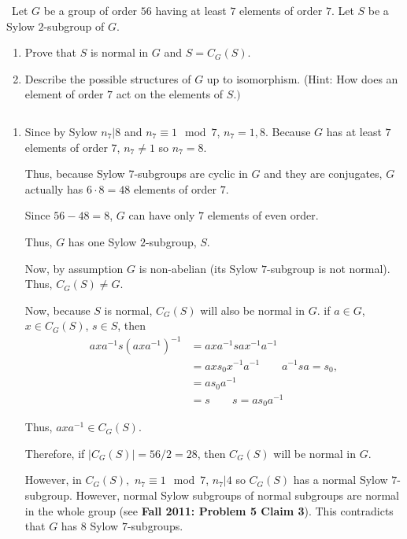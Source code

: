 \documentclass[12pt]{AlgebraQual}
\begin{document}
\begin{problem} $\,$
Let $G$ be a group of order $56$ having at least $7$ elements of order $7$. Let $S$ be a Sylow $2$-subgroup of $G.$
\begin{enumerate}[label=(\alph*)]
    \item Prove that $S$ is normal in $G$ and $S=C_G(S).$
    \item Describe the possible structures of $G$ up to isomorphism. (Hint: How does an element of order $7$ act on the elements of $S.)$
\end{enumerate}
\end{problem}


\begin{solution}$\,$
\begin{enumerate}[label=(\alph*)]
    \item Since by Sylow $n_7|8$ and $n_7\equiv 1\mod 7$, $n_7=1,8$. Because $G$ has at least $7$ elements of order $7$, $n_7\not=1$ so $n_7=8.$

    Thus, because Sylow $7$-subgroups are cyclic in $G$ and they are conjugates, $G$ actually has $6\cdot8=48$ elements of order $7.$

    Since $56-48=8$, $G$ can have only $7$ elements of even order.

    Thus, $G$ has one Sylow $2$-subgroup, $S.$

    Now, by assumption $G$ is non-abelian (its Sylow $7$-subgroup is not normal). Thus, $C_G(S)\not=G.$

    Now, because $S$ is normal, $C_G(S)$ will also be normal in $G.$ if $a\in G$, $x\in C_G(S)$, $s\in S$, then \begin{align*}
        axa^{-1}s(axa^{-1})^{-1}&=axa^{-1}sax^{-1}a^{-1}\\
        &=axs_0x^{-1}a^{-1}\qquad a^{-1}sa=s_0,\\
        &=as_0a^{-1}\\
        &=s\qquad s=as_0a^{-1}
    \end{align*}

    Thus, $axa^{-1}\in C_G(S).$

    Therefore, if $|C_G(S)|=56/2=28$, then $C_G(S)$ will be normal in $G$.

    However, in $C_G(S),$ $n_7\equiv 1\mod7$, $n_7|4$ so $C_G(S)$ has a normal Sylow $7$-subgroup. However, normal Sylow subgroups of normal subgroups are normal in the whole group (see \textbf{Fall 2011: Problem 5 Claim 3}). This contradicts that $G$ has $8$ Sylow $7$-subgroups.


\end{enumerate}
\end{solution}
\end{document}
